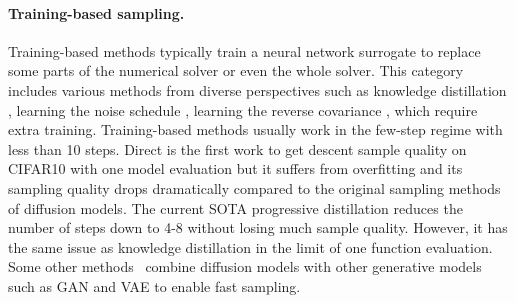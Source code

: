 \vspace{-0.1in}
\paragraph{Training-based sampling.} Training-based methods typically train a neural network surrogate to replace some parts of the numerical solver or even the whole solver. This category includes various methods from diverse perspectives such as knowledge distillation \cite{luhman2021knowledge, salimans2021progressive}, learning the noise schedule \cite{lam2021bilateral, watson2021learning}, learning the reverse covariance \cite{bao2022estimating}, which require extra training. Training-based methods usually work in the few-step regime with less than 10 steps. Direct \citet{luhman2021knowledge} is the first work to get descent sample quality on CIFAR10 with one model evaluation but it suffers from overfitting and its sampling quality drops dramatically compared to the original sampling methods of diffusion models. The current SOTA progressive distillation \cite{salimans2021progressive} reduces the number of steps down to 4-8 without losing much sample quality. However, it has the same issue as knowledge distillation in the limit of one function evaluation. Some other methods~\cite{xiao2021tackling,vahdat2021score, zheng2022truncated} combine diffusion models with other generative models such as GAN and VAE to enable fast sampling. 

